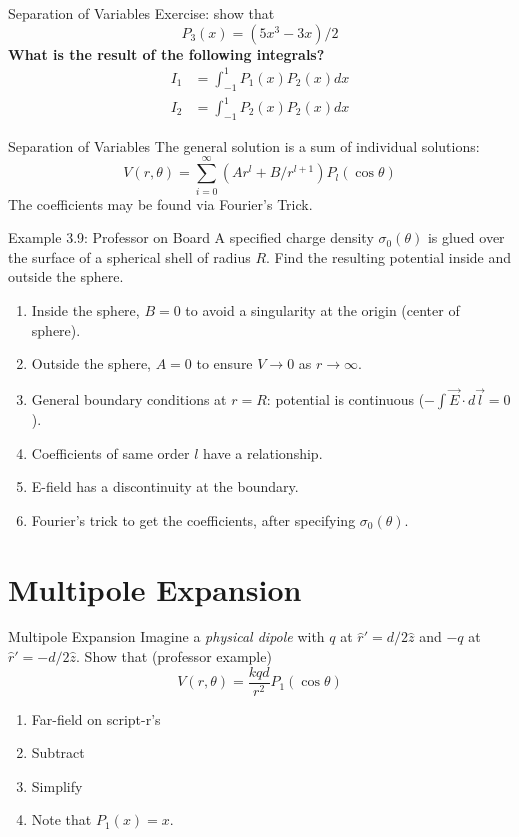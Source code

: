 \documentclass{beamer}
\begin{document}
\begin{frame}{Separation of Variables}
Exercise: show that 
\begin{equation}
P_3(x) = (5x^3 - 3x)/2
\end{equation}
\alert{\textbf{What is the result of the following integrals?}}
\begin{align}
I_1 &= \int_{-1}^{1} P_1(x) P_2(x) dx \\
I_2 &= \int_{-1}^{1} P_2(x) P_2(x) dx
\end{align}
\end{frame}

\begin{frame}{Separation of Variables}
The general solution is a sum of individual solutions:
\begin{equation}
V(r,\theta) = \sum_{i = 0}^{\infty} \left( Ar^l + B/r^{l+1} \right) P_l(\cos\theta)
\end{equation}
The coefficients may be found via Fourier's Trick.
\end{frame}

\begin{frame}{Example 3.9: Professor on Board}
A specified charge density $\sigma_0(\theta)$ is glued over the surface of a spherical shell of radius $R$.  Find the resulting potential inside and outside the sphere. \\
\begin{enumerate}
\item Inside the sphere, $B = 0$ to avoid a singularity at the origin (center of sphere).
\item Outside the sphere, $A = 0$ to ensure $V \to 0$ as $r \to \infty$.
\item General boundary conditions at $r = R$: potential is continuous ($-\int \vec{E} \cdot d\vec{l} = 0$).
\item Coefficients of same order $l$ have a relationship.
\item E-field has a discontinuity at the boundary.
\item Fourier's trick to get the coefficients, after specifying $\sigma_0(\theta)$.
\end{enumerate}
\end{frame}

\section{Multipole Expansion}

\begin{frame}{Multipole Expansion}
Imagine a \textit{physical dipole} with $q$ at $\hat{r}' = d/2 \hat{z}$ and $-q$ at $\hat{r}' = -d/2 \hat{z}$.  Show that (professor example) 
\begin{equation}
V(r,\theta) = \frac{kqd}{r^2} P_1(\cos\theta) \label{eq:basicDipole}
\end{equation}
\begin{enumerate}
\item Far-field on script-r's
\item Subtract
\item Simplify
\item Note that $P_1(x) = x$.
\end{enumerate}
\end{frame}
\end{document}
